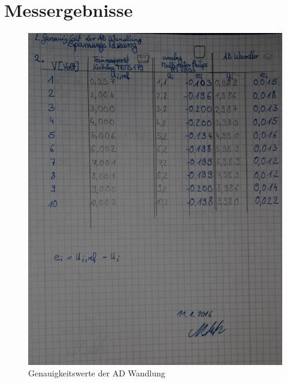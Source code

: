 \documentclass[12pt,oneside,a4paper]{report}
\begin{document}
\section{Messergebnisse}
\label{chap:APPENDIX_MEASUREMENT_SOURCE}

\begin{figure}[H]
\centering\small
\includegraphics[width=\textwidth]{src/2GenauigkeitsWerteAD.jpg}
\caption{Genauigkeitswerte der AD Wandlung}
\label{fig:AD_WERTE}
\end{figure}
\end{document}

